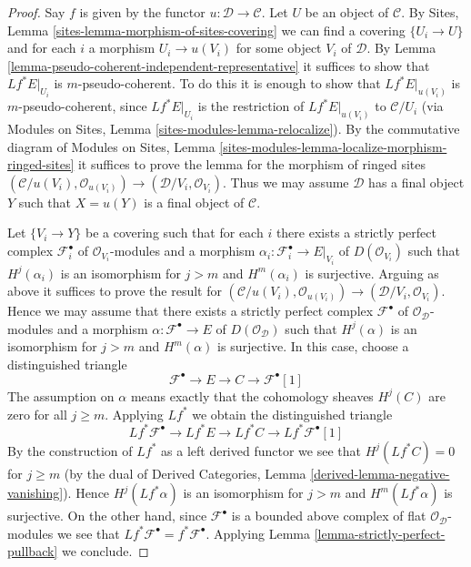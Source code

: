 \documentclass[10pt,a4paper]{amsart}
\theoremstyle{plain}
\theoremstyle{definition}
\theoremstyle{remark}
\numberwithin{equation}{subsection}
\begin{document}
\begin{proof}
Say $f$ is given by the functor $u : \mathcal{D} \to \mathcal{C}$.
Let $U$ be an object of $\mathcal{C}$. By
Sites, Lemma \ref{sites-lemma-morphism-of-sites-covering}
we can find a covering $\{U_i \to U\}$ and for each $i$ a morphism
$U_i \to u(V_i)$ for some object $V_i$ of $\mathcal{D}$.
By Lemma \ref{lemma-pseudo-coherent-independent-representative}
it suffices to show that $Lf^*E|_{U_i}$ is $m$-pseudo-coherent.
To do this it is enough to show that $Lf^*E|_{u(V_i)}$ is
$m$-pseudo-coherent, since $Lf^*E|_{U_i}$ is the restriction
of $Lf^*E|_{u(V_i)}$ to $\mathcal{C}/U_i$ (via
Modules on Sites, Lemma
\ref{sites-modules-lemma-relocalize}).
By the commutative diagram of
Modules on Sites, Lemma
\ref{sites-modules-lemma-localize-morphism-ringed-sites}
it suffices to prove the lemma for the morphism of ringed
sites $(\mathcal{C}/u(V_i), \mathcal{O}_{u(V_i)}) \to
(\mathcal{D}/V_i, \mathcal{O}_{V_i})$.
Thus we may assume $\mathcal{D}$ has a final object $Y$ such that
$X = u(Y)$ is a final object of $\mathcal{C}$.

\medskip\noindent
Let $\{V_i \to Y\}$ be a covering such that for each $i$ there exists
a strictly perfect complex $\mathcal{F}_i^\bullet$ of
$\mathcal{O}_{V_i}$-modules and a morphism
$\alpha_i : \mathcal{F}_i^\bullet \to E|_{V_i}$ of $D(\mathcal{O}_{V_i})$
such that $H^j(\alpha_i)$ is an isomorphism
for $j > m$ and $H^m(\alpha_i)$ is surjective.
Arguing as above it suffices to prove the result for
$(\mathcal{C}/u(V_i), \mathcal{O}_{u(V_i)}) \to
(\mathcal{D}/V_i, \mathcal{O}_{V_i})$. Hence we may assume that
there exists a strictly perfect complex $\mathcal{F}^\bullet$ of
$\mathcal{O}_\mathcal{D}$-modules and a morphism
$\alpha : \mathcal{F}^\bullet \to E$ of $D(\mathcal{O}_\mathcal{D})$
such that $H^j(\alpha)$ is an isomorphism
for $j > m$ and $H^m(\alpha)$ is surjective. In this case, choose
a distinguished triangle
$$
\mathcal{F}^\bullet \to E \to C \to \mathcal{F}^\bullet[1]
$$
The assumption on $\alpha$ means exactly that the cohomology sheaves
$H^j(C)$ are zero for all $j \geq m$. Applying $Lf^*$ we obtain
the distinguished triangle
$$
Lf^*\mathcal{F}^\bullet \to Lf^*E \to Lf^*C \to Lf^*\mathcal{F}^\bullet[1]
$$
By the construction of $Lf^*$ as a left derived functor we see that
$H^j(Lf^*C) = 0$ for $j \geq m$ (by the dual of Derived Categories, Lemma
\ref{derived-lemma-negative-vanishing}). Hence $H^j(Lf^*\alpha)$ is an
isomorphism for $j > m$ and $H^m(Lf^*\alpha)$ is surjective.
On the other hand, since
$\mathcal{F}^\bullet$ is a bounded above complex of flat
$\mathcal{O}_\mathcal{D}$-modules we see that
$Lf^*\mathcal{F}^\bullet = f^*\mathcal{F}^\bullet$.
Applying Lemma \ref{lemma-strictly-perfect-pullback} we conclude.
\end{proof}
\end{document}

